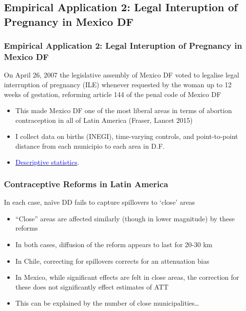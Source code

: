 \documentclass[10pt,letterpaper,subeqn]{beamer}
\begin{document}
\subsection{Empirical Application 2: Legal Interuption of Pregnancy in Mexico DF}
\begin{frame}[label=empirB]
  \frametitle{Empirical Application 2: Legal Interuption of Pregnancy in Mexico DF}
On April 26, 2007 the legislative assembly of Mexico DF voted to legalise legal 
interruption of pregnancy (ILE) whenever requested by the woman up to 12 weeks of 
gestation, reforming article 144 of the penal code of Mexico DF
\vspace{9mm}
\begin{itemize}
\item This made Mexico DF one of the most liberal areas in terms of abortion
contraception in all of Latin America (Fraser, Lancet 2015)
\item I collect data on births (INEGI), time-varying controls, and point-to-point
distance from each municipio to each area in D.F.
\item \hyperlink{MexicoDesc}{\textcolor{blue}{Descriptive statistics}}.
\end{itemize}

\end{frame}

\begin{frame}[label=empirB2]

\end{frame}

\begin{frame}[label=empirB3]
 \frametitle{Contraceptive Reforms in Latin America}
In each case, na\"ive DD fails to capture spillovers to `close' areas
\vspace{8mm}
\begin{itemize}
\item ``Close'' areas are affected similarly (though in lower magnitude) by these reforms
\item In both cases, diffusion of the reform appears to last for 20-30 km
\item In Chile, correcting for spillovers corrects for an attenuation bias
\item In Mexico, while significant effects are felt in close areas, the correction for
these does not significantly effect estimates of ATT
\item This can be explained by the number of close municipalities\ldots
\end{itemize}
\end{frame}
\end{document}
